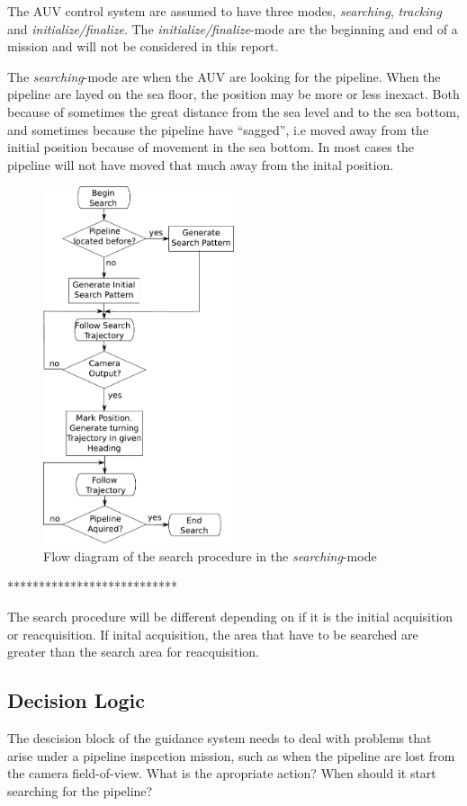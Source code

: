 	The AUV control system are assumed to have three modes, \textit{searching}, \textit{tracking} and
	\textit{initialize/finalize}. The \textit{initialize/finalize}-mode are the beginning and end of a
	mission and will not be considered in this report. 
	
	The \textit{searching}-mode are when the AUV are looking for the pipeline. When the pipeline are layed
	on the sea floor, the position may be more or less inexact. Both because of sometimes the great 
	distance from the sea level and to the sea bottom, and sometimes because the pipeline have ``sagged'', 
	i.e moved away from the initial position because of movement in the sea bottom. In most cases the
	pipeline will not have moved that much away from the inital position. 
	\begin{figure}[htbp]
		\centering
		\includegraphics[width=0.5\textwidth]{pics/search_flow}
		\caption{Flow diagram of the search procedure in the \textit{searching}-mode}
		\label{fig:ch2-search-flow}
	\end{figure}

	***************************

	The search procedure will be different depending on if it is the initial acquisition or reacquisition.
	If inital acquisition, the area that have to be searched are greater than the search area for
	reacquisition.


	\subsection{Decision Logic}
		The descision block of the guidance system needs to deal with problems that arise under a
		pipeline inspcetion mission, such as when the pipeline are lost from the camera field-of-view.
		What is the apropriate action? When should it start searching for the pipeline? 

